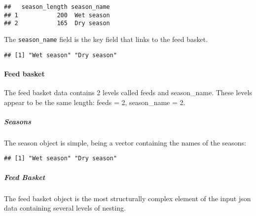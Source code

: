 \documentclass[
]{article}
\newenvironment{Shaded}{\begin{snugshade}}{\end{snugshade}}
\newcommand{\FunctionTok}[1]{\textcolor[rgb]{0.00,0.00,0.00}{#1}}
\newcommand{\NormalTok}[1]{#1}
\newcommand{\SpecialCharTok}[1]{\textcolor[rgb]{0.00,0.00,0.00}{#1}}
\begin{document}
\begin{verbatim}
##   season_length season_name
## 1           200  Wet season
## 2           165  Dry season
\end{verbatim}

The \texttt{season\_name} field is the key field that links to the feed
basket.

\begin{Shaded}
\end{Shaded}

\begin{verbatim}
## [1] "Wet season" "Dry season"
\end{verbatim}

\hypertarget{feed-basket}{%
\paragraph{Feed basket}\label{feed-basket}}

The feed basket data contains 2 levels called feeds and season\_name.
These levels appear to be the same length: feeds = 2, season\_name = 2.

\hypertarget{seasons-1}{%
\subparagraph{Seasons}\label{seasons-1}}

The season object is simple, being a vector containing the names of the
seasons:

\begin{Shaded}
\end{Shaded}

\begin{verbatim}
## [1] "Wet season" "Dry season"
\end{verbatim}

\hypertarget{feed-basket-1}{%
\subparagraph{Feed Basket}\label{feed-basket-1}}

The feed basket object is the most structurally complex element of the
input json data containing several levels of nesting.

\begin{Shaded}
\end{Shaded}
\end{document}
